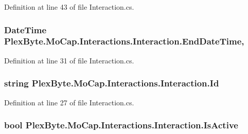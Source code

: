 Definition at line 43 of file Interaction.\+cs.

\subsubsection[{\texorpdfstring{End\+Date\+Time}{EndDateTime}}]{\setlength{\rightskip}{0pt plus 5cm}Date\+Time Plex\+Byte.\+Mo\+Cap.\+Interactions.\+Interaction.\+End\+Date\+Time\hspace{0.3cm}{\ttfamily [get]}, {\ttfamily [set]}}\hypertarget{class_plex_byte_1_1_mo_cap_1_1_interactions_1_1_interaction_a9126e226af2f8b8b8ee0be5226e50d40}{}\label{class_plex_byte_1_1_mo_cap_1_1_interactions_1_1_interaction_a9126e226af2f8b8b8ee0be5226e50d40}


Definition at line 31 of file Interaction.\+cs.

\subsubsection[{\texorpdfstring{Id}{Id}}]{\setlength{\rightskip}{0pt plus 5cm}string Plex\+Byte.\+Mo\+Cap.\+Interactions.\+Interaction.\+Id\hspace{0.3cm}{\ttfamily [get]}}\hypertarget{class_plex_byte_1_1_mo_cap_1_1_interactions_1_1_interaction_a7e29774055cca9c9e000c41af93b81b0}{}\label{class_plex_byte_1_1_mo_cap_1_1_interactions_1_1_interaction_a7e29774055cca9c9e000c41af93b81b0}


Definition at line 27 of file Interaction.\+cs.

\subsubsection[{\texorpdfstring{Is\+Active}{IsActive}}]{\setlength{\rightskip}{0pt plus 5cm}bool Plex\+Byte.\+Mo\+Cap.\+Interactions.\+Interaction.\+Is\+Active\hspace{0.3cm}{\ttfamily [get]}}\hypertarget{class_plex_byte_1_1_mo_cap_1_1_interactions_1_1_interaction_af81e89588ae6e47228671219b598647e}{}\label{class_plex_byte_1_1_mo_cap_1_1_interactions_1_1_interaction_af81e89588ae6e47228671219b598647e}


